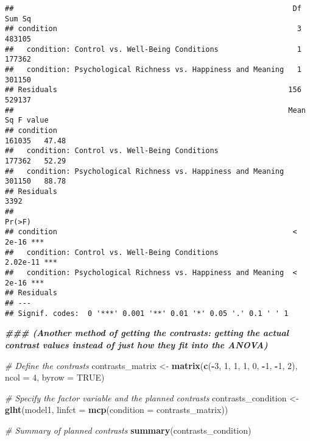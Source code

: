 \documentclass[
]{article}
\newenvironment{Shaded}{\begin{snugshade}}{\end{snugshade}}
\newcommand{\AttributeTok}[1]{\textcolor[rgb]{0.13,0.29,0.53}{#1}}
\newcommand{\CommentTok}[1]{\textcolor[rgb]{0.56,0.35,0.01}{\textit{#1}}}
\newcommand{\ConstantTok}[1]{\textcolor[rgb]{0.56,0.35,0.01}{#1}}
\newcommand{\DecValTok}[1]{\textcolor[rgb]{0.00,0.00,0.81}{#1}}
\newcommand{\DocumentationTok}[1]{\textcolor[rgb]{0.56,0.35,0.01}{\textbf{\textit{#1}}}}
\newcommand{\FunctionTok}[1]{\textcolor[rgb]{0.13,0.29,0.53}{\textbf{#1}}}
\newcommand{\NormalTok}[1]{#1}
\newcommand{\OtherTok}[1]{\textcolor[rgb]{0.56,0.35,0.01}{#1}}
\newcommand{\SpecialCharTok}[1]{\textcolor[rgb]{0.81,0.36,0.00}{\textbf{#1}}}
\begin{document}
\begin{verbatim}
##                                                                Df Sum Sq
## condition                                                       3 483105
##   condition: Control vs. Well-Being Conditions                  1 177362
##   condition: Psychological Richness vs. Happiness and Meaning   1 301150
## Residuals                                                     156 529137
##                                                               Mean Sq F value
## condition                                                      161035   47.48
##   condition: Control vs. Well-Being Conditions                 177362   52.29
##   condition: Psychological Richness vs. Happiness and Meaning  301150   88.78
## Residuals                                                        3392        
##                                                                 Pr(>F)    
## condition                                                      < 2e-16 ***
##   condition: Control vs. Well-Being Conditions                2.02e-11 ***
##   condition: Psychological Richness vs. Happiness and Meaning  < 2e-16 ***
## Residuals                                                                 
## ---
## Signif. codes:  0 '***' 0.001 '**' 0.01 '*' 0.05 '.' 0.1 ' ' 1
\end{verbatim}

\begin{Shaded}
\begin{Highlighting}[]
\DocumentationTok{\#\#\# (Another method of getting the contrasts: getting the actual contrast values instead of just how they fit into the ANOVA)}


\CommentTok{\# Define the contrasts}
\NormalTok{contrasts\_matrix }\OtherTok{\textless{}{-}} \FunctionTok{matrix}\NormalTok{(}\FunctionTok{c}\NormalTok{(}\SpecialCharTok{{-}}\DecValTok{3}\NormalTok{, }\DecValTok{1}\NormalTok{, }\DecValTok{1}\NormalTok{, }\DecValTok{1}\NormalTok{, }\DecValTok{0}\NormalTok{, }\SpecialCharTok{{-}}\DecValTok{1}\NormalTok{, }\SpecialCharTok{{-}}\DecValTok{1}\NormalTok{, }\DecValTok{2}\NormalTok{), }\AttributeTok{ncol =} \DecValTok{4}\NormalTok{, }\AttributeTok{byrow =} \ConstantTok{TRUE}\NormalTok{)}

\CommentTok{\# Specify the factor variable and the planned contrasts}
\NormalTok{contrasts\_condition }\OtherTok{\textless{}{-}} \FunctionTok{glht}\NormalTok{(model1, }\AttributeTok{linfct =} \FunctionTok{mcp}\NormalTok{(}\AttributeTok{condition =}\NormalTok{ contrasts\_matrix))}

\CommentTok{\# Summary of planned contrasts}
\FunctionTok{summary}\NormalTok{(contrasts\_condition)}
\end{Highlighting}
\end{Shaded}
\end{document}
